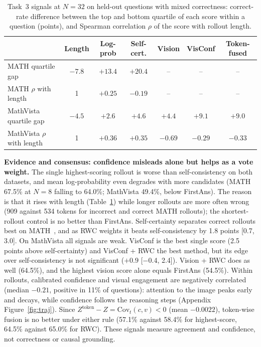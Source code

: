 \documentclass{article}
\newcommand{\ci}[2]{{\scriptsize[#1, #2]}}
\begin{document}
\begin{table}[t]
\centering
\caption{Task~3 signals at $N{=}32$ on held-out questions with mixed correctness: correct-rate difference between the top and bottom quartile of each score within a question (points), and Spearman correlation $\rho$ of the score with rollout length.}
\label{tab:t3-sig}
\small
\setlength{\tabcolsep}{5pt}
\begin{tabular}{lcccccc}
\toprule
 & Length & Log-prob & Self-cert. & Vision & VisConf & Token-fused\\
\midrule
MATH quartile gap & $-7.8$ & $+13.4$ & $+20.4$ & -- & -- & --\\
MATH $\rho$ with length & 1 & $+0.25$ & $-0.19$ & -- & -- & --\\
MathVista quartile gap & $-4.5$ & $+2.6$ & $+4.6$ & $+4.4$ & $+9.1$ & $+9.0$\\
MathVista $\rho$ with length & 1 & $+0.36$ & $+0.35$ & $-0.69$ & $-0.29$ & $-0.33$\\
\bottomrule
\end{tabular}
\end{table}

\textbf{Evidence and consensus: confidence misleads alone but helps as a vote weight.} The single highest-scoring rollout is worse than self-consistency on both datasets, and mean log-probability even degrades with more candidates (MATH 67.5\% at $N{=}8$ falling to 64.0\%; MathVista 49.4\%, below FirstAns). The reason is that it rises with length (Table~\ref{tab:t3-sig}) while longer rollouts are more often wrong (909 against 534 tokens for incorrect and correct MATH rollouts); the shortest-rollout control is no better than FirstAns. Self-certainty separates correct rollouts best on MATH~\cite{kang2025selfcertainty}, and as RWC weights it beats self-consistency by 1.8 points \ci{0.7}{3.0}. On MathVista all signals are weak. VisConf is the best single score (2.5 points above self-certainty) and VisConf + RWC the best method, but its edge over self-consistency is not significant ($+0.9$ \ci{$-$0.4}{2.4}). Vision + RWC does as well (64.5\%), and the highest vision score alone equals FirstAns (54.5\%). Within rollouts, calibrated confidence and visual engagement are negatively correlated (median $-0.21$, positive in 11\% of questions): attention to the image peaks early and decays, while confidence follows the reasoning steps (Appendix Figure~\ref{fig:traj}). Since $Z^{\text{token}}-Z=\mathrm{Cov}_t(c,v)<0$ (mean $-0.0022$), token-wise fusion is no better under either rule (57.1\% against 58.4\% for highest-score, 64.5\% against 65.0\% for RWC). These signals measure agreement and confidence, not correctness or causal grounding.
\end{document}
